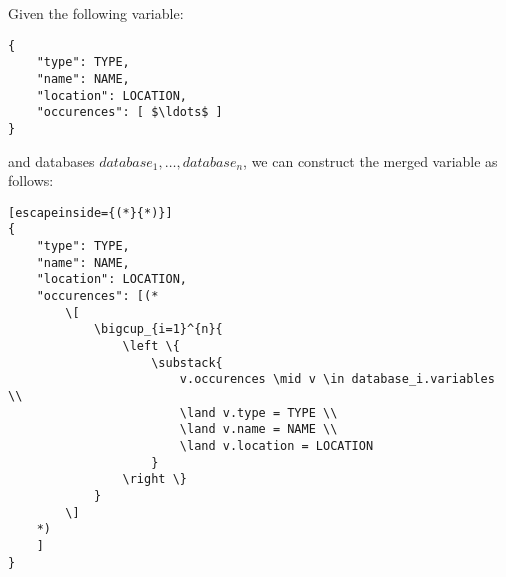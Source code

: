 Given the following variable:
\begin{lstlisting}[mathescape]
{
	"type": TYPE,
	"name": NAME,
	"location": LOCATION,
	"occurences": [ $\ldots$ ]
}
\end{lstlisting}
and databases $database_1, \ldots, database_n$, we can construct the merged
variable as follows:

\begin{lstlisting}[escapeinside={(*}{*)}]
{
	"type": TYPE,
	"name": NAME,
	"location": LOCATION,
	"occurences": [(*
		\[
			\bigcup_{i=1}^{n}{
				\left \{
					\substack{
						v.occurences \mid v \in database_i.variables \\
						\land v.type = TYPE \\
						\land v.name = NAME \\
						\land v.location = LOCATION
					}
				\right \}
			}
		\]
	*)
	]
}
\end{lstlisting}
